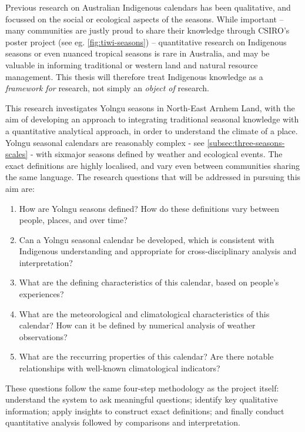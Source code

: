 Previous research on Australian Indigenous calendars \citep[eg.][]{%
CSIROcals,BOM-iwk,clarke2009,davis1989,atlas2014}
has been qualitative, and focussed on the social or ecological aspects of
the seasons.  While important -- many communities are justly proud to share
their knowledge through CSIRO's poster project (see eg. \cref{fig:tiwi-seasons})
-- quantitative research on Indigenous seasons or even nuanced tropical seasons
is rare in Australia, and may be valuable in informing traditional or western
land and natural resource management.  This thesis will therefore treat
Indigenous knowledge as a \emph{framework for} research, not simply an
\emph{object of} research.


This research investigates Yolngu seasons in North-East Arnhem Land, with the
aim of developing an approach to integrating traditional seasonal knowledge
with a quantitative analytical approach, in order to understand the climate
of a place.  Yolngu seasonal calendars are reasonably complex - see
\cref{subsec:three-seasons-scales} - with six\footnotemark major seasons defined by
weather and ecological events.  The exact definitions are highly localised,
and vary even between communities sharing the same language.
%
%
The research questions that will be addressed in pursuing this aim are:
\begin{enumerate}
\item How are Yolngu seasons defined?  How do these definitions vary between
    people, places, and over time?
\item Can a Yolngu seasonal calendar be developed, which is consistent with Indigenous
    understanding and appropriate for cross-disciplinary analysis and interpretation?
\item What are the defining characteristics of this calendar, based on
    people's experiences?
\item What are the meteorological and climatological characteristics of this
    calendar?  How can it be defined by numerical analysis of weather observations?
\item What are the reccurring properties of this calendar?  Are there notable
    relationships with well-known climatological indicators?
\end{enumerate}

These questions follow the same four-step methodology as the project itself:
understand the system to ask meaningful questions; identify key
qualitative information; apply insights to construct exact definitions; and
finally conduct quantitative analysis followed by comparisons and interpretation.

